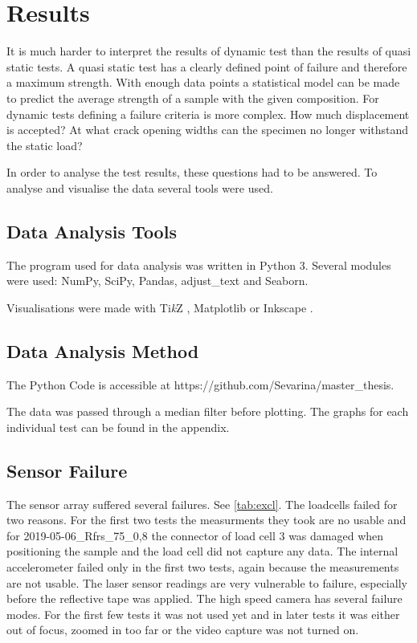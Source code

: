 \chapter{Results}
\label{cha:res}

It is much harder to interpret the results of dynamic test than the results of quasi static tests. A quasi static test has a clearly defined point of failure and therefore a maximum strength. With enough data points a statistical model can be made to predict the average strength of a sample with the given composition. For dynamic tests defining a failure criteria is more complex. How much displacement is accepted? At what crack opening widths can the specimen no longer withstand the static load?

In order to analyse the test results, these questions had to be answered. To analyse and visualise the data several tools were used.

\section{Data Analysis Tools}

The program used for data analysis was written in Python 3. \autocite{python} Several modules were used: NumPy, SciPy, Pandas, adjust\_text and Seaborn. \autocite{numpy} \autocite{Scipy} \autocite{Pandas} \autocite{adjust_text} \autocite{seaborn}

Visualisations were made with Ti\textit{k}Z \autocite{Tikz}, Matplotlib \autocite{matplotlib} or Inkscape \autocite{Inkscape}. 

\section{Data Analysis Method}

The Python Code is accessible at https://github.com/Sevarina/master\_thesis.

The data was passed through a median filter before plotting. The graphs for each individual test can be found in the appendix.

\section{Sensor Failure}
\label{sec:exc}

The sensor array suffered several failures. See \autoref{tab:excl}. The loadcells failed for two reasons. For the first two tests the measurments they took are no usable and for 2019-05-06\_Rfrs\_75\_0,8 the connector of load cell 3 was damaged when positioning the sample and the load cell did not capture any data. The internal accelerometer failed only in the first two tests, again because the measurements are not usable. The laser sensor readings are very vulnerable to failure, especially before the reflective tape was applied. The high speed camera has several failure modes. For the first few tests it was not used yet and in later tests it was either out of focus, zoomed in too far or the video capture was not turned on. 


